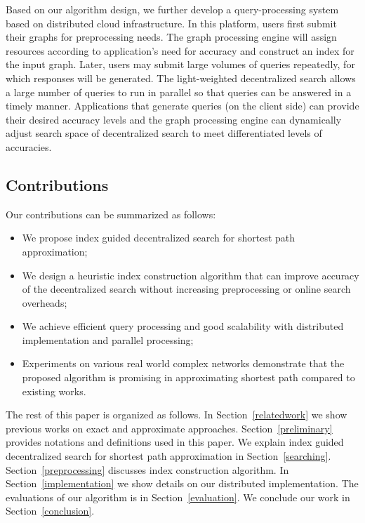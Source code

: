 Based on our algorithm design, we further develop a query-processing system based on distributed cloud infrastructure. In this platform, users first submit their graphs for preprocessing needs. The graph processing engine will assign resources according to application's need for accuracy and construct an index for the input graph. Later, users may submit large volumes of queries repeatedly, for which responses will be generated. The light-weighted decentralized search allows a large number of queries to run in parallel so that queries can be answered in a timely manner. Applications that generate queries (on the client side) can provide their desired accuracy levels and the graph processing engine can dynamically adjust search space of decentralized search to meet differentiated levels of accuracies.

\subsection{Contributions}
Our contributions can be summarized as follows:

\begin{itemize}
	\item We propose index guided decentralized search for shortest path approximation;
	\item We design a heuristic index construction algorithm that can improve accuracy of the decentralized search without increasing preprocessing or online search overheads;
	\item We achieve efficient query processing and good scalability with distributed implementation and parallel processing;
	\item Experiments on various real world complex networks demonstrate that the proposed algorithm is promising in approximating shortest path compared to existing works.
\end{itemize}

The rest of this paper is organized as follows. In Section~\ref{relatedwork} we show previous works on exact and approximate approaches. Section~\ref{preliminary} provides notations and definitions used in this paper. We explain index guided decentralized search for shortest path approximation in Section~\ref{searching}. Section~\ref{preprocessing} discusses index construction algorithm. In Section~\ref{implementation} we show details on our distributed implementation. The evaluations of our algorithm is in Section~\ref{evaluation}.  We conclude our work in Section~\ref{conclusion}.
